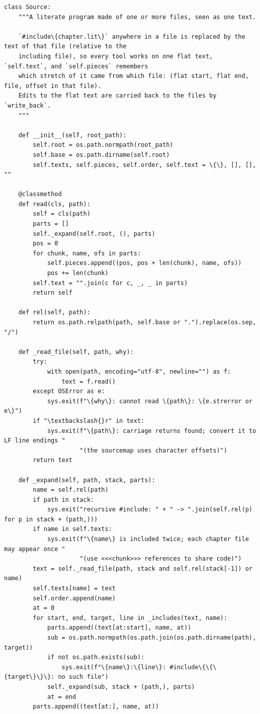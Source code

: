 \documentclass[10pt,a4paper]{article}
\newcounter{chunk}
\begin{document}
\begin{Verbatim}
class Source:
    """A literate program made of one or more files, seen as one text.

    `#include\{chapter.lit\}` anywhere in a file is replaced by the text of that file (relative to the
    including file), so every tool works on one flat text, `self.text`, and `self.pieces` remembers
    which stretch of it came from which file: (flat start, flat end, file, offset in that file).
    Edits to the flat text are carried back to the files by `write_back`.
    """

    def __init__(self, root_path):
        self.root = os.path.normpath(root_path)
        self.base = os.path.dirname(self.root)
        self.texts, self.pieces, self.order, self.text = \{\}, [], [], ""

    @classmethod
    def read(cls, path):
        self = cls(path)
        parts = []
        self._expand(self.root, (), parts)
        pos = 0
        for chunk, name, ofs in parts:
            self.pieces.append((pos, pos + len(chunk), name, ofs))
            pos += len(chunk)
        self.text = "".join(c for c, _, _ in parts)
        return self

    def rel(self, path):
        return os.path.relpath(path, self.base or ".").replace(os.sep, "/")

    def _read_file(self, path, why):
        try:
            with open(path, encoding="utf-8", newline="") as f:
                text = f.read()
        except OSError as e:
            sys.exit(f"\{why\}: cannot read \{path\}: \{e.strerror or e\}")
        if "\textbackslash{}r" in text:
            sys.exit(f"\{path\}: carriage returns found; convert it to LF line endings "
                     "(the sourcemap uses character offsets)")
        return text

    def _expand(self, path, stack, parts):
        name = self.rel(path)
        if path in stack:
            sys.exit("recursive #include: " + " -> ".join(self.rel(p) for p in stack + (path,)))
        if name in self.texts:
            sys.exit(f"\{name\} is included twice; each chapter file may appear once "
                     "(use <<<chunk>>> references to share code)")
        text = self._read_file(path, stack and self.rel(stack[-1]) or name)
        self.texts[name] = text
        self.order.append(name)
        at = 0
        for start, end, target, line in _includes(text, name):
            parts.append((text[at:start], name, at))
            sub = os.path.normpath(os.path.join(os.path.dirname(path), target))
            if not os.path.exists(sub):
                sys.exit(f"\{name\}:\{line\}: #include\{\{\{target\}\}\}: no such file")
            self._expand(sub, stack + (path,), parts)
            at = end
        parts.append((text[at:], name, at))


\end{Verbatim}
\end{document}
